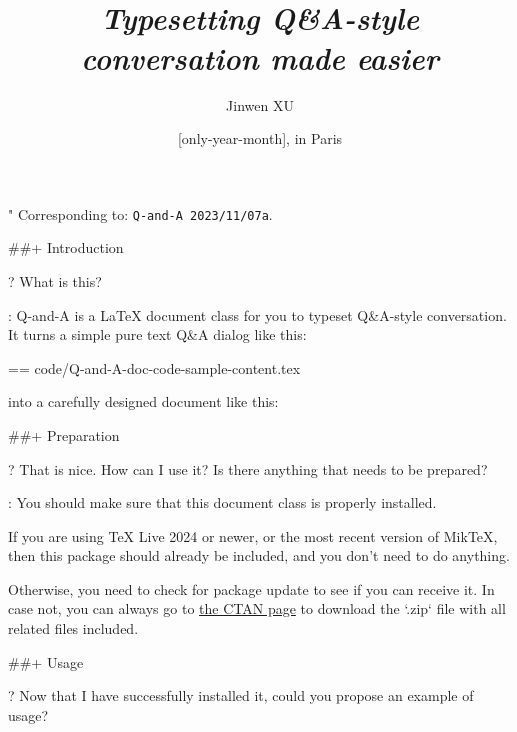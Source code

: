 \documentclass[%
  use style = classical,
  scroll,
]{Q-and-A}
\title{\QApackage{}\\\smallskip\itshape Typesetting Q\&A-style conversation made easier}
\author{Jinwen XU}
\date{\TheDate{\PackageVersion}[only-year-month], in Paris}
\def\PackageVersion{2023/11/07}
\def\PackageSubVersion{a}
\newcommand{\QApackage}{{\normalfont\textsf{Q-and-A}}}
\begin{document}
\maketitle

"
  Corresponding to: {\normalfont\texttt{\QApackage{}~\PackageVersion\PackageSubVersion}}.


##+ {Introduction}

?
  What is this?

:
  \QApackage{} is a \LaTeX{} document class for you to typeset Q\&A-style conversation. It turns a simple pure text Q\&A dialog like this:

  == {code/Q-and-A-doc-code-sample-content.tex}

  into a carefully designed document like this:

  \begin{center}
  \end{center}


##+ {Preparation}

?
  That is nice. How can I use it? Is there anything that needs to be prepared?

:
  You should make sure that this document class is properly installed.

  If you are using TeX Live 2024 or newer, or the most recent version of MikTeX, then this package should already be included, and you don't need to do anything.

  Otherwise, you need to check for package update to see if you can receive it. In case not, you can always go to \href{https://ctan.org/pkg/Q-and-A}{the CTAN page} to download the `.zip` file with all related files included.


##+ {Usage}

?
  Now that I have successfully installed it, could you propose an example of usage?
\end{document}

